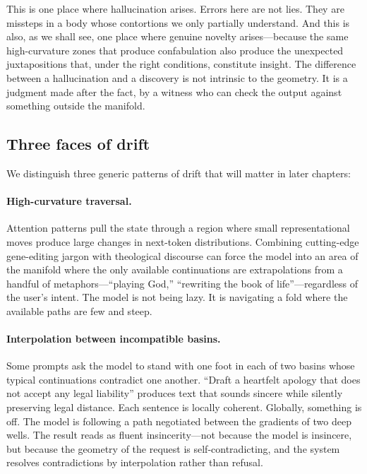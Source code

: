 This is one place where hallucination arises. Errors here are not lies. They are missteps in a body whose contortions we only partially understand. And this is also, as we shall see, one place where genuine novelty arises---because the same high-curvature zones that produce confabulation also produce the unexpected juxtapositions that, under the right conditions, constitute insight. The difference between a hallucination and a discovery is not intrinsic to the geometry. It is a judgment made after the fact, by a witness who can check the output against something outside the manifold.

\subsection*{Three faces of drift}

We distinguish three generic patterns of drift that will matter in later chapters:

\paragraph{High-curvature traversal.} Attention patterns pull the state through a region where small representational moves produce large changes in next-token distributions. Combining cutting-edge gene-editing jargon with theological discourse can force the model into an area of the manifold where the only available continuations are extrapolations from a handful of metaphors---``playing God,'' ``rewriting the book of life''---regardless of the user's intent. The model is not being lazy. It is navigating a fold where the available paths are few and steep.

\paragraph{Interpolation between incompatible basins.} Some prompts ask the model to stand with one foot in each of two basins whose typical continuations contradict one another. ``Draft a heartfelt apology that does not accept any legal liability'' produces text that sounds sincere while silently preserving legal distance. Each sentence is locally coherent. Globally, something is off. The model is following a path negotiated between the gradients of two deep wells. The result reads as fluent insincerity---not because the model is insincere, but because the geometry of the request is self-contradicting, and the system resolves contradictions by interpolation rather than refusal.


